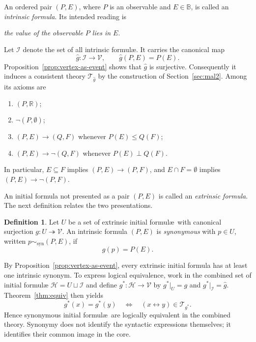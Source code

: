 \documentclass{article}   	%
\theoremstyle{plain}
\theoremstyle{definition}
\newtheorem{definition}[theorem]{Definition}
\theoremstyle{remark}
\begin{document}
An ordered pair $(P,E)$, where $P$ is an observable and $E\in\mathbb B$, is
called an \emph{intrinsic formula}.  Its intended reading is
\begin{center}
\emph{the value of the observable $P$ lies in $E$}.
\end{center}
Let $\mathcal I$ denote the set of all intrinsic formul\ae.  It carries the
canonical map
\begin{equation}
\label{eq:trans}
\widehat g:\mathcal I\longrightarrow\mathcal V,
\qquad
\widehat g(P,E)=P(E).
\end{equation}
Proposition~\ref{prop:vertex-as-event} shows that $\widehat g$ is surjective.
Consequently it induces a consistent theory $\mathcal T_{\widehat g}$ by the
construction of Section~\ref{sec:mal2}.  Among its axioms are
\begin{enumerate}
\item[($\alpha_1$)] $(P,\mathbb R)$;
\item[($\alpha_2$)] $\neg(P,\emptyset)$;
\item[($\alpha_3$)] $(P,E)\to(Q,F)$ whenever $P(E)\le Q(F)$;
\item[($\alpha_4$)] $(P,E)\to\neg(Q,F)$ whenever $P(E)\perp Q(F)$.
\end{enumerate}
In particular, $E\subseteq F$ implies
$(P,E)\to(P,F)$, and $E\cap F=\emptyset$ implies
$(P,E)\to\neg(P,F)$.

An initial formula not presented as a pair $(P,E)$ is called an
\emph{extrinsic formula}.  The next definition relates the two presentations.

\begin{definition}
\label{def:syn}
Let $U$ be a set of extrinsic initial formul\ae\ with canonical surjection
$g:U\twoheadrightarrow\mathcal V$.  An intrinsic formula $(P,E)$ is
\emph{synonymous} with $p\in U$, written
$p\sim_{\mathrm{syn}}(P,E)$, if
\[
g(p)=P(E).
\]
\end{definition}

By Proposition~\ref{prop:vertex-as-event}, every extrinsic initial formula has
at least one intrinsic synonym.  To express logical equivalence, work in the
combined set of initial formul\ae
$\mathcal H=U\sqcup\mathcal I$ and define
$g^*:\mathcal H\to\mathcal V$ by
$g^*|_U=g$ and $g^*|_{\mathcal I}=\widehat g$.
Theorem~\ref{thm:equiv} then yields
\[
g^*(x)=g^*(y)
\quad\Longleftrightarrow\quad
(x\leftrightarrow y)\in\mathcal T_{g^*}.
\]
Hence synonymous initial formul\ae\ are logically equivalent in the combined
theory.  Synonymy does not identify the syntactic expressions themselves; it
identifies their common image in the core.
\end{document}
